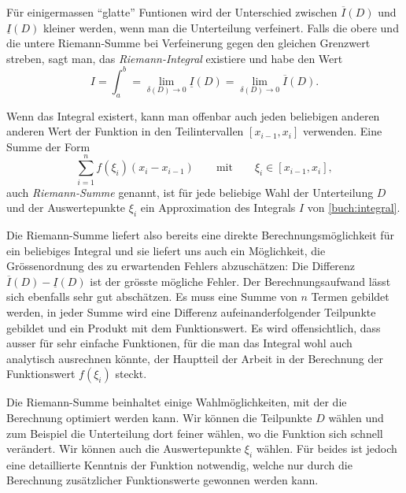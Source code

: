 Für einigermassen ``glatte'' Funtionen wird der Unterschied zwischen
$\overline{I}(D)$ und $\underline{I}(D)$ kleiner werden, wenn man die 
Unterteilung verfeinert.
%
%
Falls die obere und die untere Riemann-Summe bei Verfeinerung gegen
den gleichen Grenzwert streben, sagt man, das {\em Riemann-Integral}
%
%
existiere und habe den Wert
\[
I
=
\int_a^b
=
\lim_{\delta(D)\to 0} \underline{I}(D)
=
\lim_{\delta(D)\to 0} \overline{I}(D).
\]

Wenn das Integral existert, kann man offenbar auch jeden beliebigen
anderen anderen Wert der Funktion in den Teilintervallen $[x_{i-1},x_i]$
verwenden.
Eine Summe der Form
\[
\sum_{i=1}^n f(\xi_i) (x_{i}-x_{i-1})
\qquad\text{mit}\qquad \xi_i \in [x_{i-1},x_i],
\]
auch {\em Riemann-Summe} genannt,
ist für jede beliebige Wahl der Unterteilung $D$ und der Auswertepunkte
$\xi_i$ ein Approximation des Integrals $I$ von \eqref{buch:integral}.
%

Die Riemann-Summe liefert also bereits eine direkte Berechnungsmöglichkeit
für ein beliebiges Integral und sie liefert uns auch ein Möglichkeit,
die Grössenordnung des zu erwartenden Fehlers abzuschätzen:
Die Differenz $\overline{I}(D)-\underline{I}(D)$ ist der grösste mögliche
Fehler.
%
Der Berechnungsaufwand lässt sich ebenfalls sehr gut abschätzen.
Es muss eine Summe von $n$ Termen gebildet werden, in jeder Summe
wird eine Differenz aufeinanderfolgender Teilpunkte gebildet und
ein Produkt mit dem Funktionswert.
Es wird offensichtlich, dass ausser für sehr einfache Funktionen, für die
man das Integral wohl auch analytisch ausrechnen könnte, der Hauptteil der
Arbeit in der Berechnung der Funktionswert $f(\xi_i)$ steckt.

Die Riemann-Summe beinhaltet einige Wahlmöglichkeiten, mit der die
Berechnung optimiert werden kann.
Wir können die Teilpunkte $D$ wählen und zum Beispiel die Unterteilung
dort feiner wählen, wo die Funktion sich schnell verändert.
Wir können auch die Auswertepunkte $\xi_i$ wählen.
Für beides ist jedoch eine detaillierte Kenntnis der Funktion notwendig,
welche nur durch die Berechnung zusätzlicher Funktionswerte gewonnen
werden kann.


